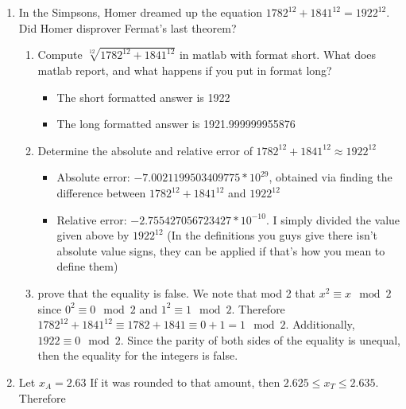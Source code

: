 \documentclass[12pt, letterpaper]{article}
\begin{document}
\begin{enumerate}
\begin{enumerate}
		$11.11$ in binary.
		\item What is the smallest positive number that can be represented?  That would have to be $0.5$ or 
		$0.1000$ in binary
		\item What is the machine epsilon?  That is, the smallest $\epsilon > 0$ such that $1+\epsilon$ is 
		representable.  The $\epsilon$ would have to be $0.125$ or $0.001$ in binary.  This is the case because 
		after the assumed $1$ in the decimal, there are three decimals of precision.  Therefore one can choose the last 
		digit to be 1, yielding $1.001$
	\end{enumerate}
	\item In the Simpsons, Homer dreamed up the equation $1782^{12} + 1841^{12} = 1922^{12}$.  Did Homer disprover 
	Fermat's last theorem?
	\begin{enumerate}
		\item Compute $\sqrt[12]{1782^{12} + 1841^{12}}$ in matlab with format short.  What does matlab report, and what 
		happens if you put in format long?
		\begin{itemize}
			\item The short formatted answer is 1922
			\item The long formatted answer is 1921.999999955876
		\end{itemize}
		\item Determine the absolute and relative error of $1782^{12} + 1841^{12} \approx 1922^{12}$
			\begin{itemize}
				\item Absolute error: $-7.0021199503409775*10^{29}$, obtained via finding the difference between $1782^{12} + 1841^{12}$ and
				$1922^{12}$
				\item Relative error: $-2.755427056723427*10^{-10}$.  I simply divided the value given above by $1922^12$ (In the definitions you guys give there isn't absolute value signs, they can be applied if that's how you mean to define them)
			\end{itemize}
		\item prove that the equality is false.  We note that mod 2 that $x^2 \equiv x \mod{2}$ since $0^2 \equiv 0 \mod{2}$ and $1^2 \equiv 1 \mod{2}$.  Therefore $1782^{12} + 1841^{12} \equiv 1782 + 1841 \equiv 0 + 1 = 1 \mod{2}$.
		Additionally, $1922 \equiv 0 \mod{2}$.  Since the parity of both sides of the equality is unequal, then 
		the equality for the integers is false.  
	\end{enumerate}
	\item Let $x_A = 2.63$  If it was rounded to that amount, then $2.625 \leq x_T \leq 2.635$.  Therefore 

\end{enumerate}
\end{document}
